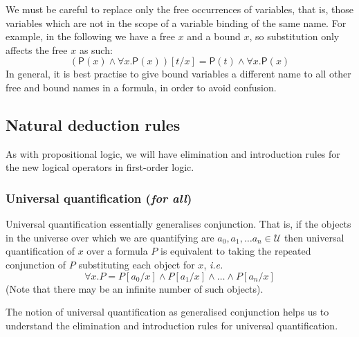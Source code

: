 \documentclass{article}
\theoremstyle{definition}
\newcommand{\rel}[1]{\mathsf{#1}}
\newcommand{\ie}{\emph{i.e.}}
\begin{document}
We must be careful to replace only the free
occurrences of variables, that is, those variables which are not in
the scope of a variable binding of the same name. For example, in the
following we have a free $x$ and a bound $x$, so substitution only
affects the free $x$ as such:
%
\begin{equation*}
(\rel{P}(x) \wedge \forall x . \rel{P}(x))[t/x] 
= \rel{P}(t) \wedge \forall x . \rel{P}(x)
\end{equation*}
%
In general, it is best practise to give bound variables a different name
to all other free and bound names in a formula, in order to avoid confusion.

\subsection{Natural deduction rules}

As with propositional logic, we will have elimination and introduction
rules for the new logical operators in first-order logic.

\subsubsection{Universal quantification (\emph{for all})}

Universal quantification essentially generalises conjunction.  That
is, if the objects in the universe over which we are quantifying are
$a_0, a_1, \ldots a_n \in \mathcal{U}$ then universal quantification
of $x$ over a formula $P$ is equivalent to taking the repeated
conjunction of $P$ substituting each object for $x$, \ie{}
%
\begin{equation}
\forall x . P = P[a_0/x] \wedge P[a_1/x] \wedge
\ldots \wedge P[a_{n}/x]
\label{eq:forall-meaning}
\end{equation}
%
(Note that there may be an infinite number of such objects).

The notion of universal quantification as generalised conjunction
helps us to understand the elimination and introduction rules for universal
quantification.
\end{document}
